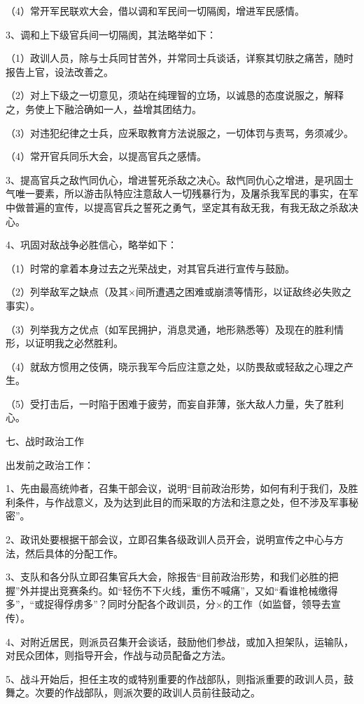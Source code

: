 （4）常开军民联欢大会，借以调和军民间一切隔阂，增进军民感情。

3、调和上下级官兵间一切隔阂，其法略举如下：

（1）政训人员，除与士兵同甘苦外，并常同士兵谈话，详察其切肤之痛苦，随时报告上官，设法改善之。

（2）对上下级之一切意见，须站在纯理智的立场，以诚恳的态度说服之，解释之，务使上下融洽确如一人，益增其团结力。

（3）对违犯纪律之士兵，应釆取教育方法说服之，一切体罚与责骂，务须减少。

（4）常开官兵同乐大会，以提高官兵之感情。

3、提高官兵之敌忾同仇心，增进誓死杀敌之决心。敌忾同仇心之增进，是巩固士气唯一要素，所以游击队特应注意敌人一切残暴行为，及屠杀我军民的事实，在军中做普遍的宣传，以提高官兵之誓死之勇气，坚定其有敌无我，有我无敌之杀敌决心。

4、巩固对敌战争必胜信心，略举如下：

（1）时常的拿着本身过去之光荣战史，对其官兵进行宣传与鼓励。

（2）列举敌军之缺点（及其×间所遭遇之困难或崩溃等情形，以证敌终必失败之事实）。

（3）列举我方之优点（如军民拥护，消息灵通，地形熟悉等）及现在的胜利情形，以证明我之必然胜利。

（4）就敌方惯用之伎俩，晓示我军今后应注意之处，以防畏敌或轻敌之心理之产生。

（5）受打击后，一时陷于困难于疲劳，而妄自菲薄，张大敌人力量，失了胜利心。

七、战时政治工作

出发前之政治工作：

1、先由最高统帅者，召集干部会议，说明“目前政治形势，如何有利于我们，及胜利条件，与作战意义，及为达到此目的而采取的方法和注意之处，但不涉及军事秘密”。

2、政讯处要根据干部会议，立即召集各级政训人员开会，说明宣传之中心与方法，然后具体的分配工作。

3、支队和各分队立即召集官兵大会，除报告“目前政治形势，和我们必胜的把握”外并提出竞赛条约。如“轻伤不下火线，重伤不喊痛”，又如“看谁枪械缴得多”，“或捉得俘虏多”？同时分配各个政训员，分×的工作（如监督，领导去宣传）。

4、对附近居民，则派员召集开会谈话，鼓励他们参战，或加入担架队，运输队，对民众团体，则指导开会，作战与动员配备之方法。

5、战斗开始后，担任主攻的或特别重要的作战部队，则指派重要的政训人员，鼓舞之。次要的作战部队，则派次要的政训人员前往鼓动之。


